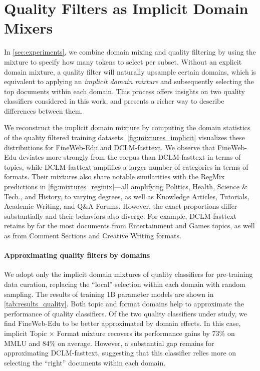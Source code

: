 
\section{Quality Filters as Implicit Domain Mixers}
\label{sec:quality_filters}



In \autoref{sec:experiments}, we combine domain mixing and quality filtering by using the mixture to specify how many tokens to select per subset.
Without an explicit domain mixture, a quality filter will naturally upsample certain domains, 
which is equivalent to applying an \textit{implicit domain mixture} and subsequently selecting the top documents within each domain.
This process offers insights on two quality classifiers considered in this work, and presents a richer way to describe differences between them.

We reconstruct the implicit domain mixture by computing the domain statistics of the quality filtered training datasets.
\autoref{fig:mixtures_implicit} visualizes these distributions for FineWeb-Edu and DCLM-fasttext.
We observe that FineWeb-Edu deviates more strongly from the corpus than DCLM-fasttext in terms of topics, while DCLM-fasttext amplifies a larger number of categories in terms of formats.
Their mixtures also share notable similarities with the RegMix predictions in \autoref{fig:mixtures_regmix}---all amplifying {\atopic Politics}, {\atopic Health}, {\atopic Science \& Tech.}, and {\atopic History}, to varying degrees, as well as {\aformat Knowledge Articles}, {\aformat Tutorials}, {\aformat Academic Writing}, and {\aformat Q\&A Forums}. 
However, the exact proportions differ substantially and their behaviors also diverge. For example, DCLM-fasttext retains by far the most documents from {\atopic Entertainment} and {\atopic Games} topics, as well as from {\aformat Comment Sections} and {\aformat Creative Writing} formats.

\ificml\else\begin{minipage}[t]{0.45\linewidth}\fi
\paragraph{Approximating quality filters by domains}
We adopt only the implicit domain mixtures of quality classifiers for pre-training data curation,
replacing the ``local'' selection within each domain with random sampling.
The results of training 1B parameter models are shown in \autoref{tab:results_quality}.
Both topic and format domains help to approximate the performance of quality classifiers. 
Of the two quality classifiers under study, we find FineWeb-Edu to be better approximated by domain effects.
In this case, implicit Topic $\times$ Format mixture recovers its performance gains by 73\% on MMLU and 84\% on average.
However, a substantial gap remains for approximating DCLM-fasttext, suggesting that this classifier relies more on selecting the ``right'' documents within each domain.
\ificml
    
\else
\end{minipage}\hfill
\begin{minipage}[t]{0.5\linewidth}
    
\end{minipage}
\fi

